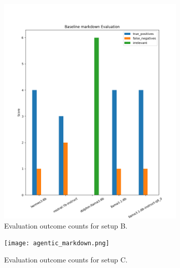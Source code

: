 \begin{figure}[H]
  \centering
  \includegraphics[width=0.8\textwidth]{baseline_markdown.png}
  \caption{Evaluation outcome counts for setup B.}
  \label{fig:baseline_markdown}
\end{figure}

\begin{figure}[H]
  \centering
  \texttt{[image: agentic\_markdown.png]}
  \caption{Evaluation outcome counts for setup C.}
  \label{fig:agentic_markdown.png}
\end{figure}

